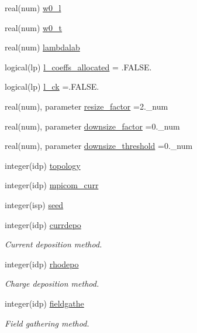 \begin{DoxyCompactItemize}
real(num) \hyperlink{namespaceparams_a099f9a730e6ea2a9410eb86769458372}{w0\+\_\+l}
\item 
real(num) \hyperlink{namespaceparams_a7a94c587421680abbe506082d28ff8b6}{w0\+\_\+t}
\item 
real(num) \hyperlink{namespaceparams_a24b22ed48dbf0d3d0f582e6db7d40a76}{lambdalab}
\item 
logical(lp) \hyperlink{namespaceparams_a4b1f8ff700f30016bbf830bc640b49da}{l\+\_\+coeffs\+\_\+allocated} = .F\+A\+L\+S\+E.
\item 
logical(lp) \hyperlink{namespaceparams_a15761ff2e6c2554f53e451a6a7d3b5e5}{l\+\_\+ck} =.F\+A\+L\+S\+E.
\item 
real(num), parameter \hyperlink{namespaceparams_a70195e670ef122bc4f91d74793b68621}{resize\+\_\+factor} =2.\+\_\+num
\item 
real(num), parameter \hyperlink{namespaceparams_a1e70b45a865ed6ef7927e0b49669a567}{downsize\+\_\+factor} =0.\+\_\+num
\item 
real(num), parameter \hyperlink{namespaceparams_aa81c22d18e165451716c4b23ea6fbdb1}{downsize\+\_\+threshold} =0.\+\_\+num
\item 
integer(idp) \hyperlink{namespaceparams_a259d1ed7155ef66db12c877a797fc0f0}{topology}
\item 
integer(idp) \hyperlink{namespaceparams_a5e7c931ca55f3ac5e5171dc97c3269b1}{mpicom\+\_\+curr}
\item 
integer(isp) \hyperlink{namespaceparams_ae32095407c8380779cfc1562a62d15e3}{seed}
\item 
integer(idp) \hyperlink{namespaceparams_af4ccf29a8c1f3a8a47f08f5cbbcd30eb}{currdepo}
\begin{DoxyCompactList}\small\item\em Current deposition method. \end{DoxyCompactList}\item 
integer(idp) \hyperlink{namespaceparams_ae892561d7462a1e54b9b6b2bbe1adc4c}{rhodepo}
\begin{DoxyCompactList}\small\item\em Charge deposition method. \end{DoxyCompactList}\item 
integer(idp) \hyperlink{namespaceparams_afef819010f4c590b2d6f9ecde05bd4c5}{fieldgathe}
\begin{DoxyCompactList}\small\item\em Field gathering method. \end{DoxyCompactList}\item 

\end{DoxyCompactItemize}
